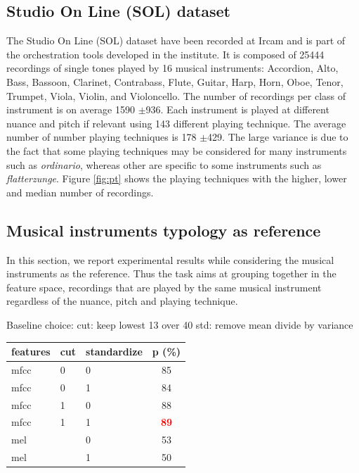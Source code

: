 \documentclass{article}
\begin{document}
\subsection{Studio On Line (SOL) dataset}

The Studio On Line (SOL) dataset have been recorded at Ircam and is part of the orchestration tools developed in the institute. It is composed of 25444 recordings of single tones played by 16 musical instruments: Accordion, Alto, Bass, Bassoon, Clarinet, Contrabass, Flute, Guitar, Harp, Horn, Oboe, Tenor, Trumpet, Viola, Violin, and Violoncello. The number of recordings per class of instrument is on average 1590 $\pm$936.  Each instrument is played at different nuance and pitch if relevant using 143 different playing technique. The average number of number playing techniques is 178 $\pm$429. The large variance is due to the fact that some playing techniques may be considered for many instruments such as \textit{ordinario}, whereas other are specific to some instruments such as \textit{flatterzunge}. Figure \ref{fig:pt} shows the playing techniques with the higher, lower and median number of recordings.


\subsection{Musical instruments typology as reference}

In this section, we report experimental results while considering the musical instruments as the reference. Thus the task aims at grouping together in the feature space, recordings that are played by the same musical instrument regardless of the nuance, pitch and playing technique.

Baseline choice:
cut: keep lowest 13 over 40
std: remove mean divide by variance
\begin{tabular}{lllc}
features & cut & standardize & p (\%) \\
\hline
mfcc & 0 & 0 & 85 \\
mfcc & 0 & 1 & 84 \\
mfcc & 1 & 0 & 88 \\
mfcc & 1 & 1 & \textbf{\textcolor{red}{89}} \\
mel &  & 0 & 53 \\
mel &  & 1 & 50 \\
\end{tabular}
\end{document}
